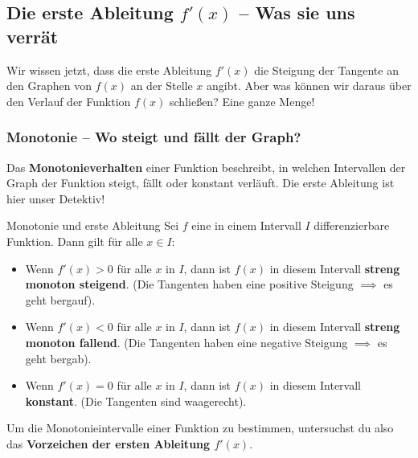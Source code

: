 \subsection{Die erste Ableitung $f'(x)$ – Was sie uns verrät}
\label{subsec:erste_ableitung_bedeutung}

Wir wissen jetzt, dass die erste Ableitung $f'(x)$ die Steigung der Tangente an den Graphen von $f(x)$ an der Stelle $x$ angibt. Aber was können wir daraus über den Verlauf der Funktion $f(x)$ schließen? Eine ganze Menge!

\subsubsection{Monotonie – Wo steigt und fällt der Graph?}

Das \textbf{Monotonieverhalten} einer Funktion beschreibt, in welchen Intervallen der Graph der Funktion steigt, fällt oder konstant verläuft. Die erste Ableitung ist hier unser Detektiv!

\begin{merksatzumgebung}{Monotonie und erste Ableitung}
Sei $f$ eine in einem Intervall $I$ differenzierbare Funktion. Dann gilt für alle $x \in I$:
\begin{itemize}
    \item Wenn $f'(x) > 0$ für alle $x$ in $I$, dann ist $f(x)$ in diesem Intervall \textbf{streng monoton steigend}. (Die Tangenten haben eine positive Steigung $\implies$ es geht bergauf).
    \item Wenn $f'(x) < 0$ für alle $x$ in $I$, dann ist $f(x)$ in diesem Intervall \textbf{streng monoton fallend}. (Die Tangenten haben eine negative Steigung $\implies$ es geht bergab).
    \item Wenn $f'(x) = 0$ für alle $x$ in $I$, dann ist $f(x)$ in diesem Intervall \textbf{konstant}. (Die Tangenten sind waagerecht).
\end{itemize}
Um die Monotonieintervalle einer Funktion zu bestimmen, untersuchst du also das \textbf{Vorzeichen der ersten Ableitung $f'(x)$}.
\end{merksatzumgebung}

